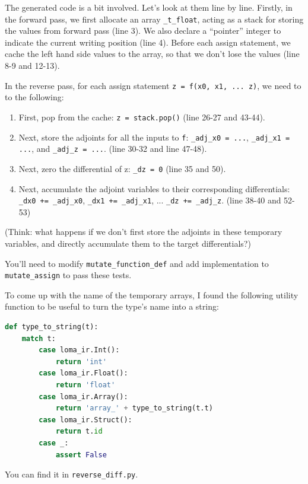 The generated code is a bit involved. Let's look at them line by line. Firstly, in the forward pass, we first allocate an array \lstinline{_t_float}, acting as a stack for storing the values from forward pass (line 3). We also declare a ``pointer'' integer to indicate the current writing position (line 4). Before each assign statement, we cache the left hand side values to the array, so that we don't lose the values (line 8-9 and 12-13).

In the reverse pass, for each assign statement \lstinline{z = f(x0, x1, ... z)}, we need to to the following:
\begin{enumerate}
	\item First, pop from the cache: \lstinline{z = stack.pop()} (line 26-27 and 43-44).
	\item Next, store the adjoints for all the inputs to \lstinline{f}: \lstinline{_adj_x0 = ...}, \lstinline{_adj_x1 = ...}, and \lstinline{_adj_z = ...}. (line 30-32 and line 47-48).
	\item Next, zero the differential of z: \lstinline{_dz = 0} (line 35 and 50).
	\item Next, accumulate the adjoint variables to their corresponding differentials: \lstinline{_dx0 += _adj_x0}, \lstinline{_dx1 += _adj_x1}, ... \lstinline{_dz += _adj_z}. (line 38-40 and 52-53)
\end{enumerate}
(Think: what happens if we don't first store the adjoints in these temporary variables, and directly accumulate them to the target differentials?)

You'll need to modify \lstinline{mutate_function_def} and add implementation to \lstinline{mutate_assign} to pass these tests.

To come up with the name of the temporary arrays, I found the following utility function to be useful to turn the type's name into a string:
\begin{lstlisting}[language=Python]
def type_to_string(t):
    match t:
        case loma_ir.Int():
            return 'int'
        case loma_ir.Float():
            return 'float'
        case loma_ir.Array():
            return 'array_' + type_to_string(t.t)
        case loma_ir.Struct():
            return t.id
        case _:
            assert False
\end{lstlisting}
You can find it in \lstinline{reverse_diff.py}.

